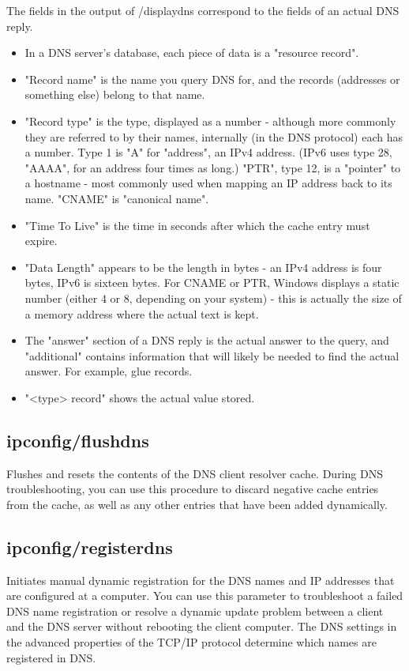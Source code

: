 \documentclass[a4paper,12pt]{book}
\begin{document}
The fields in the output of /displaydns correspond to the fields of an actual DNS reply.

\begin{itemize}
\item{In a DNS server's database, each piece of data is a "resource record".}
\item{"Record name" is the name you query DNS for, and the records (addresses or something else) belong to that name.}
\item{"Record type" is the type, displayed as a number - although more commonly they are referred to by their names, internally (in the DNS protocol) each has a number. Type 1 is "A" for "address", an IPv4 address. (IPv6 uses type 28, "AAAA", for an address four times as long.) "PTR", type 12, is a "pointer" to a hostname - most commonly used when mapping an IP address back to its name. "CNAME" is "canonical name".}
\item{"Time To Live" is the time in seconds after which the cache entry must expire.}
\item{"Data Length" appears to be the length in bytes - an IPv4 address is four bytes, IPv6 is sixteen bytes. For CNAME or PTR, Windows displays a static number (either 4 or 8, depending on your system) - this is actually the size of a memory address where the actual text is kept.}
\item{The "answer" section of a DNS reply is the actual answer to the query, and "additional" contains information that will likely be needed to find the actual answer. For example, glue records.}
\item{"<type> record" shows the actual value stored.}
\end{itemize}


\subsection{ipconfig/flushdns}
Flushes and resets the contents of the DNS client resolver cache. During DNS troubleshooting, you can use this procedure to discard negative cache entries from the cache, as well as any other entries that have been added dynamically.

\subsection{ipconfig/registerdns}
Initiates manual dynamic registration for the DNS names and IP addresses that are configured at a computer. You can use this parameter to troubleshoot a failed DNS name registration or resolve a dynamic update problem between a client and the DNS server without rebooting the client computer. The DNS settings in the advanced properties of the TCP/IP protocol determine which names are registered in DNS.
\end{document}

